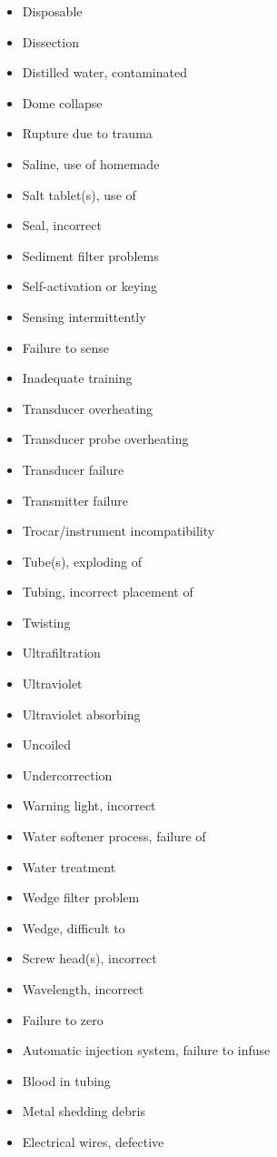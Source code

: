 \documentclass{beamer}
\begin{document}
\begin{frame}
\begin{multicols}{4}
\begin{itemize}
  \item Disposable
  \item Dissection
  \item Distilled water, contaminated
  \item Dome collapse
  \item Rupture due to trauma
  \item Saline, use of homemade
  \item Salt tablet(s), use of
  \item Seal, incorrect
  \item Sediment filter problems
  \item Self-activation or keying
  \item Sensing intermittently
  \item Failure to sense
  \item Inadequate training
  \item Transducer overheating
  \item Transducer probe overheating
  \item Transducer failure
  \item Transmitter failure
  \item Trocar/instrument incompatibility
  \item Tube(s), exploding of
  \item Tubing, incorrect placement of
  \item Twisting
  \item Ultrafiltration
  \item Ultraviolet
  \item Ultraviolet absorbing
  \item Uncoiled
  \item Undercorrection
  \item Warning light, incorrect
  \item Water softener process, failure of
  \item Water treatment
  \item Wedge filter problem
  \item Wedge, difficult to
  \item Screw head(s), incorrect
  \item Wavelength, incorrect
  \item Failure to zero
  \item Automatic injection system, failure to infuse
  \item Blood in tubing
  \item Metal shedding debris
  \item Electrical wires, defective

\end{itemize}
\end{multicols}
\end{frame}
\end{document}

